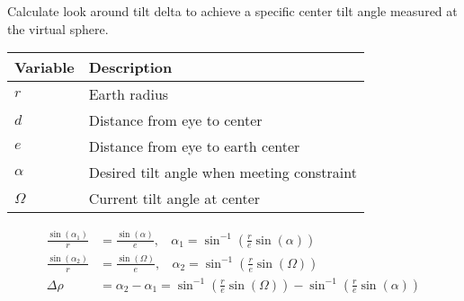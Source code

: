 \documentclass{paper}
\begin{document}
Calculate look around tilt delta to achieve a specific center tilt angle
measured at the virtual sphere.

\begin{table}[h!tb]
  \centering
  \begin{tabular}{l l}
  \toprule
  \textbf{Variable} & \textbf{Description} \\
  \midrule
  $r$ & Earth radius \\
  $d$ & Distance from eye to center \\
  $e$ & Distance from eye to earth center \\
  $\alpha$ & Desired tilt angle when meeting constraint \\
  $\Omega$ & Current tilt angle at center \\
  \bottomrule
  \end{tabular}
\end{table}

\begingroup
\addtolength{\jot}{1em}
\begin{align*}
  \frac{\sin{\left(\alpha_1\right)}}{r} & = \frac{\sin{\left(\alpha\right)}}{e},~~~~
  \alpha_1 = \sin^{-1}{\left(\frac{r}{e} \sin{\left(\alpha\right)}\right)} \\
  \frac{\sin{\left(\alpha_2\right)}}{r} & = \frac{\sin{\left(\Omega\right)}}{e},~~~~
  \alpha_2 = \sin^{-1}{\left(\frac{r}{e} \sin{\left(\Omega\right)}\right)} \\
  \Delta \rho & = \alpha_2 - \alpha_1 =
  \sin^{-1}{\left(\frac{r}{e} \sin{\left(\Omega\right)}\right)} - \sin^{-1}{\left(\frac{r}{e} \sin{\left(\alpha\right)}\right)}
\end{align*}
\endgroup
\end{document}
